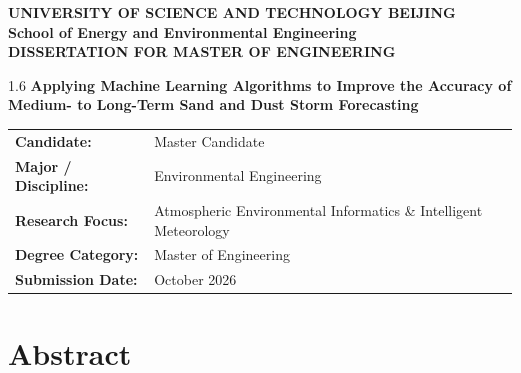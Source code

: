 \documentclass[12pt,a4paper,openany,twoside]{book}
\begin{document}
\frontmatter

\begin{titlepage}
\centering
\vspace*{1.5cm}

{\LARGE \textbf{UNIVERSITY OF SCIENCE AND TECHNOLOGY BEIJING}}\\[0.4cm]
{\Large \textbf{School of Energy and Environmental Engineering}}\\[1.8cm]

{\Large \textbf{DISSERTATION FOR MASTER OF ENGINEERING}}\\[2.0cm]

\begin{spacing}{1.6}
{\LARGE \textbf{Applying Machine Learning Algorithms to Improve the Accuracy of Medium- to Long-Term Sand and Dust Storm Forecasting}}
\end{spacing}

\vfill

\begin{minipage}{0.85\textwidth}
\large
\begin{tabular}{ll}
\textbf{Candidate:} & Master Candidate \\
\textbf{Major / Discipline:} & Environmental Engineering \\
\textbf{Research Focus:} & Atmospheric Environmental Informatics \& Intelligent Meteorology \\
\textbf{Degree Category:} & Master of Engineering \\
\textbf{Submission Date:} & October 2026
\end{tabular}
\end{minipage}

\vspace*{2.0cm}
\end{titlepage}

\cleardoublepage
\chapter*{Abstract}
\end{document}
